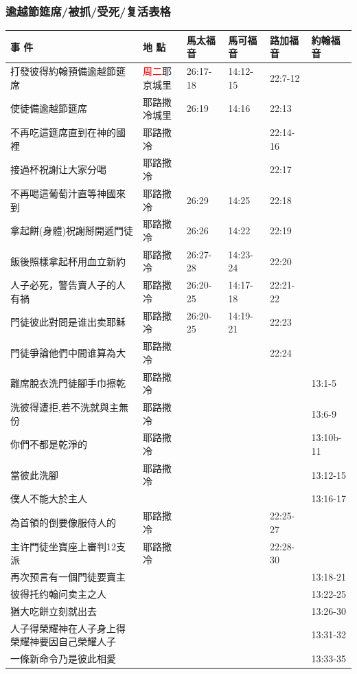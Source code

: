 \subsubsection{逾越節筵席/被抓/受死/复活表格}
\begin{table}[H] \centering
\begin{tabular}{p{14em}|p{7.93em}|l|l|l|p{4.855em}} \toprule
\textbf{事 件} & \textbf{地 點} & \multicolumn{1}{p{5.285em}|}{\textbf{馬太福音}} & \multicolumn{1}{p{5.57em}|}{\textbf{馬可福音}} & \multicolumn{1}{p{5.285em}|}{\textbf{路加福音}} & \textbf{約翰福音} \\  \midrule
打發彼得約翰預備逾越節筵席&\textcolor{red}{周二}耶京城里&26:17-18&14:12-15&22:7-12&  \\\midrule
使徒備逾越節筵席&耶路撒冷城里&26:19&14:16&22:13&  \\\midrule
不再吃這筵席直到在神的國裡&耶路撒冷&&&22:14-16&  \\\midrule
接過杯祝謝让大家分喝&耶路撒冷&&&22:17&  \\\midrule
不再喝這葡萄汁直等神國來到&耶路撒冷&26:29&14:25&22:18&  \\\midrule
拿起餅(身體)祝謝掰開遞門徒&耶路撒冷&26:26&14:22&22:19&  \\\midrule
飯後照樣拿起杯用血立新約&耶路撒冷&26:27-28&14:23-24&22:20&  \\\midrule

人子必死，警告賣人子的人有禍&耶路撒冷&26:20-25&14:17-18&22:21-22&  \\\midrule
門徒彼此對問是谁出卖耶稣&耶路撒冷&26:20-25&14:19-21&22:23&  \\\midrule
門徒爭論他們中間谁算為大&耶路撒冷&& &22:24&  \\\midrule

離席脫衣洗門徒腳手巾擦乾&耶路撒冷&& &&13:1-5\\\midrule
洗彼得遭拒,若不洗就與主無份&耶路撒冷&& &&13:6-9\\\midrule
你們不都是乾淨的&耶路撒冷&& &&13:10b-11\\\midrule


當彼此洗腳&耶路撒冷&& &&13:12-15\\\midrule
僕人不能大於主人&& &&&13:16-17\\\midrule
為首領的倒要像服侍人的&耶路撒冷&&&22:25-27&  \\\midrule
主许門徒坐寶座上審判12支派&耶路撒冷&& &22:28-30&  \\\midrule

再次预言有一個門徒要賣主&& &&&13:18-21\\\midrule
彼得托约翰问卖主之人&& &&&13:22-25\\\midrule
猶大吃餅立刻就出去&& &&&13:26-30\\\midrule
人子得榮耀神在人子身上得榮耀神要因自己榮耀人子&& &&&13:31-32\\\midrule
一條新命令乃是彼此相愛&& &&&13:33-35\\\midrule


\end{tabular}
\end{table}
